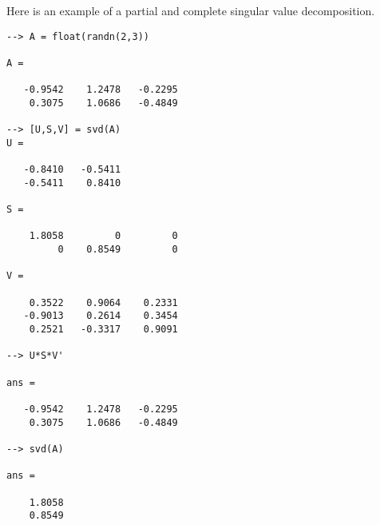 Here is an example of a partial and complete singular value
decomposition.
\begin{verbatim}
--> A = float(randn(2,3))

A = 

   -0.9542    1.2478   -0.2295 
    0.3075    1.0686   -0.4849 

--> [U,S,V] = svd(A)
U = 

   -0.8410   -0.5411 
   -0.5411    0.8410 

S = 

    1.8058         0         0 
         0    0.8549         0 

V = 

    0.3522    0.9064    0.2331 
   -0.9013    0.2614    0.3454 
    0.2521   -0.3317    0.9091 

--> U*S*V'

ans = 

   -0.9542    1.2478   -0.2295 
    0.3075    1.0686   -0.4849 

--> svd(A)

ans = 

    1.8058 
    0.8549 
\end{verbatim}
